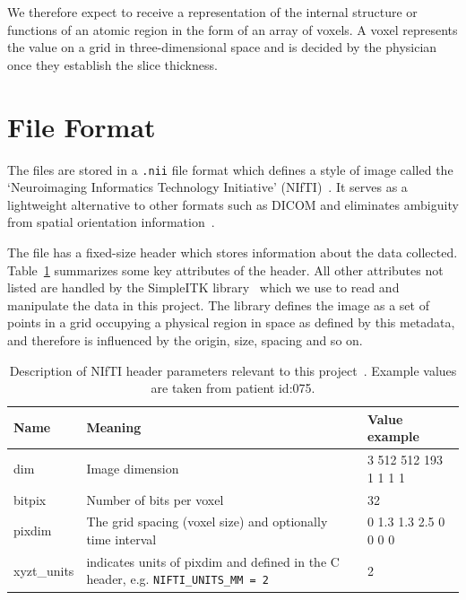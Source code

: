 \documentclass[11pt,twoside]{report}
\begin{document}
We therefore expect to receive a representation of the internal structure or functions of an atomic region in the form of an array of voxels. A voxel represents the value on a grid in three-dimensional space and is decided by the physician once they establish the slice thickness.

\section{File Format}\label{sec:data-file-format}

The files are stored in a \texttt{.nii} file format which defines a style of image called the `Neuroimaging Informatics Technology Initiative' (NIfTI)~\cite{file-formats}. It serves as a lightweight alternative to other formats such as DICOM and eliminates ambiguity from spatial orientation information~\cite{dicom-to-nifti-conversion}.

The file has a fixed-size header which stores information about the data collected. Table~\ref{tab:nifti-header} summarizes some key attributes of the header. All other attributes not listed are handled by the SimpleITK library~\cite{SimpleITK-paper} which we use to read and manipulate the data in this project. The library defines the image as a set of points in a grid occupying a physical region in space as defined by this metadata, and therefore is influenced by the origin, size, spacing and so on.

\begin{table}[ht]
  \centering
  \begin{tabular}{>{\raggedright}p{1.5cm}p{8cm}p{4cm}}
    \toprule
    \textbf{Name} & \textbf{Meaning}                                                                          & \textbf{Value example} \\
    \midrule
    dim           & Image dimension                                                                           & 3 512 512 193 1 1 1 1  \\
    bitpix        & Number of bits per voxel                                                                  & 32                     \\
    pixdim        & The grid spacing (voxel size) and optionally time interval                                & 0 1.3 1.3 2.5 0 0 0 0  \\
    xyzt\_units   & indicates units of pixdim and defined in the C header, e.g. \texttt{NIFTI\_UNITS\_MM = 2} & 2                      \\
    \bottomrule
  \end{tabular}
  \caption{Description of NIfTI header parameters relevant to this project~\cite{dicom-to-nifti-conversion, nifti-headers, nifti-data-format}. Example values are taken from patient id:075.}
  \label{tab:nifti-header}
\end{table}
\end{document}
